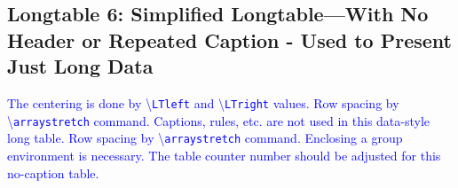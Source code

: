 \documentclass[phd]{ndsu-thesis-2022}
\newcommand\italk[1]{\textcolor{blue}{#1}}  %
\newcommand\cmd[1]{\textbackslash\texttt{#1}}  %
\begin{document}
\subsection{Longtable 6: Simplified Longtable---With No Header or Repeated Caption - Used to Present Just Long Data}

\italk{The centering is done by \cmd{LTleft} and \cmd{LTright} values. Row spacing by \\\cmd{arraystretch} command. Captions, rules, etc. are not used in this data-style long table. Row spacing by \cmd{arraystretch} command. Enclosing a group environment is necessary. The table counter number should be adjusted for this no-caption table.}

\begingroup
\setlength{\LTleft}{0.5cm plus -1fill}%
\setlength{\LTright}{\LTleft}%
\renewcommand{\arraystretch}{0.6}%
\end{document}
